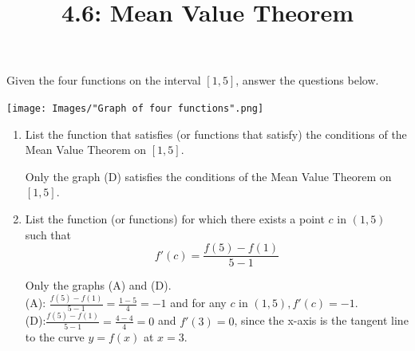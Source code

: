 \documentclass[nooutcomes,handout]{ximera}
\title{4.6: Mean Value Theorem}
\begin{document}
\begin{abstract}		\end{abstract}
\maketitle

\begin{problem}

  Given the four functions on the interval $[1, 5]$, answer the questions below.
  \begin{image}
    \texttt{[image: Images/"Graph of four functions".png]}
  \end{image}
  \begin{enumerate}
    \item
      List the function that satisfies (or functions that satisfy) the conditions of the Mean Value Theorem on $[1, 5]$.
      \begin{freeResponse}
        Only the graph (D) satisfies the conditions of the Mean Value Theorem on $[1,5]$.
      \end{freeResponse}
    \item
      List the function (or functions) for which there exists a point $c$ in $(1, 5)$ such that 
      \[
        f'(c) = \frac{f(5) - f(1)}{5 - 1}
      \]
      \begin{freeResponse}
        Only the graphs (A) and (D).\\
          (A): $\frac{f(5)-f(1)}{5-1}=\frac{1-5}{4}=-1$ and for any $c$ in $(1,5), f'(c)=-1$.\\
          (D):$\frac{f(5)-f(1)}{5-1}=\frac{4-4}{4}=0$ and $f'(3)=0$, since the x-axis is the tangent line to the curve $y=f(x)$ at $x=3$.
      \end{freeResponse}
  \end{enumerate}
\end{problem}
\end{document}
